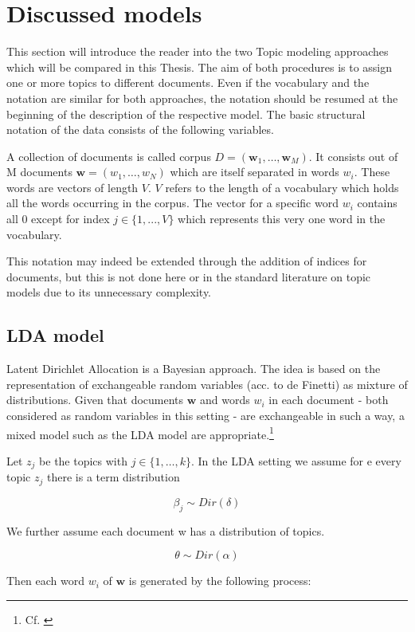 \documentclass[11pt,a4paper]{article}
\author{Sebastian Knigge}
\begin{document}
\section{Discussed models}

This section will introduce the reader into the two Topic modeling approaches which will be compared in this Thesis. The aim of both procedures is to assign one or more topics to different documents. Even if the vocabulary and the notation are similar for both approaches, the notation should be resumed at the beginning of the description of the respective model. The basic structural notation of the data consists of the following variables.

A collection of documents is called corpus $D=(\textbf{w}_1,\dots , \textbf{w}_M)$. It consists out of M documents $\textbf{w}=(w_1,\dots, w_N)$ which are itself separated in words $w_i$. These words are vectors of length $V$. $V$ refers to the length of a vocabulary which holds all the words occurring in the corpus. The vector for a specific word $w_i$ contains all 0 except for index $j\in\{1,...,V\}$ which represents this very one word in the vocabulary.

This notation may indeed be extended through the addition of indices for documents, but this is not done here or in the standard literature on topic models due to its unnecessary complexity.

\subsection{LDA model}
Latent Dirichlet Allocation is a Bayesian approach. The idea is based on the representation of exchangeable random variables (acc. to de Finetti) as mixture of distributions. Given that documents $\textbf{w}$ and words $w_i$ in each document - both considered as random variables in this setting - are exchangeable in such a way, a mixed model such as the LDA model are appropriate.\footnote{Cf. \cite{Blei2003}}

Let $z_j$ be the topics with $j\in\{1,\dots,k\}$. In the LDA setting we assume for e every topic $z_j$ there is a term distribution

$$\beta_j \sim Dir(\delta)$$

We further assume each document w has a distribution of topics.

$$\theta \sim Dir(\alpha)$$

Then each word $w_i$ of $\textbf{w}$ is generated by the following process:
\end{document}
